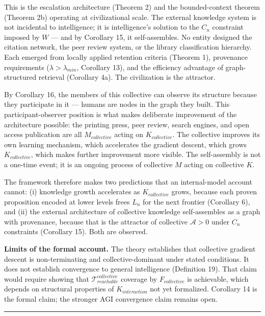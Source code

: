 \documentclass[
]{article}
\begin{document}
This is the escalation architecture (Theorem 2) and the bounded-context
theorem (Theorem 2b) operating at civilizational scale. The external
knowledge system is not incidental to intelligence; it is intelligence's
solution to the \(C_n\) constraint imposed by \(W\) --- and by Corollary
15, it self-assembles. No entity designed the citation network, the peer
review system, or the library classification hierarchy. Each emerged
from locally applied retention criteria (Theorem 1), provenance
requirements (\(\lambda > \lambda_{min}\), Corollary 13), and the
efficiency advantage of graph-structured retrieval (Corollary 4a). The
civilization is the attractor.

By Corollary 16, the members of this collective can observe its
structure because they participate in it --- humans are nodes in the
graph they built. This participant-observer position is what makes
deliberate improvement of the architecture possible: the printing press,
peer review, search engines, and open access publication are all
\(M_{collective}\) acting on \(K_{collective}\). The collective improves
its own learning mechanism, which accelerates the gradient descent,
which grows \(K_{collective}\), which makes further improvement more
visible. The self-assembly is not a one-time event; it is an ongoing
process of collective \(M\) acting on collective \(K\).

The framework therefore makes two predictions that an internal-model
account cannot: (i) knowledge growth accelerates as \(K_{collective}\)
grows, because each proven proposition encoded at lower levels frees
\(L_n\) for the next frontier (Corollary 6), and (ii) the external
architecture of collective knowledge self-assembles as a graph with
provenance, because that is the attractor of collective
\(\mathcal{A} > 0\) under \(C_n\) constraints (Corollary 15). Both are
observed.

\textbf{Limits of the formal account.} The theory establishes that
collective gradient descent is non-terminating and collective-dominant
under stated conditions. It does not establish convergence to general
intelligence (Definition 19). That claim would require showing that
\(\mathcal{T}_{reachable}^{collective}\) coverage by \(F_{collective}\)
is achievable, which depends on structural properties of
\(K_{interaction}\) not yet formalized. Corollary 14 is the formal
claim; the stronger AGI convergence claim remains open.

\begin{center}\rule{0.5\linewidth}{0.5pt}\end{center}
\end{document}
